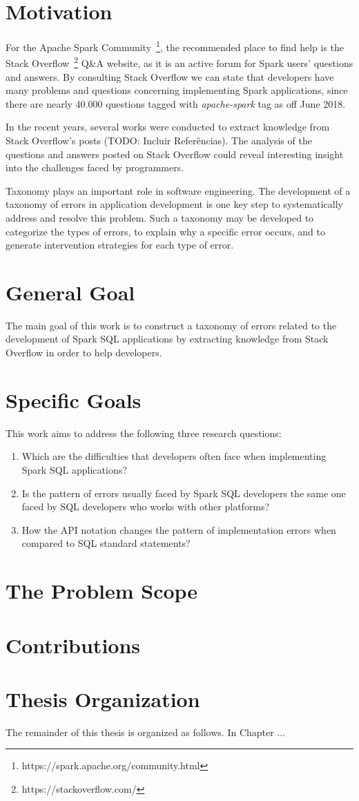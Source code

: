 \section{Motivation}

For the Apache Spark Community~\footnote{https://spark.apache.org/community.html}, the recommended place to find help is the Stack Overflow~\footnote{https://stackoverflow.com/} Q\&A website, as it is an active forum for Spark users’ questions and answers. By consulting Stack Overflow we can state that developers have many problems and questions concerning implementing Spark applications, since there are nearly 40.000 questions tagged with \emph{apache-spark} tag as off June 2018.

In the recent years, several works were conducted  to extract knowledge from Stack Overflow's posts (TODO: Incluir Referências). The analysis of the questions and answers posted on Stack Overflow could reveal interesting insight into the challenges faced
by programmers.

Taxonomy plays an important role in software engineering. The development of a taxonomy of errors in application development is one key step to systematically address and resolve this problem. Such a taxonomy may be developed to categorize the types of errors, to explain why a specific error occurs, and to generate intervention strategies for each type of error.


\section{General Goal}

The main goal of this work is to construct a taxonomy of errors related to the development of Spark SQL applications by extracting knowledge from Stack Overflow in order to help developers.

\section{Specific Goals}

This work aims to address the following three research questions:

\begin{enumerate}
    \item Which are the difficulties that developers often face when implementing Spark SQL applications?
    \item Is the pattern of errors usually faced by Spark SQL developers the same one faced by SQL developers who works with other platforms?
    \item How the API notation changes the pattern of implementation errors when compared to SQL standard statements? 
\end{enumerate}



\section{The Problem Scope}

\section{Contributions}

\section{Thesis Organization}

The remainder of this thesis is organized as follows. In Chapter ...